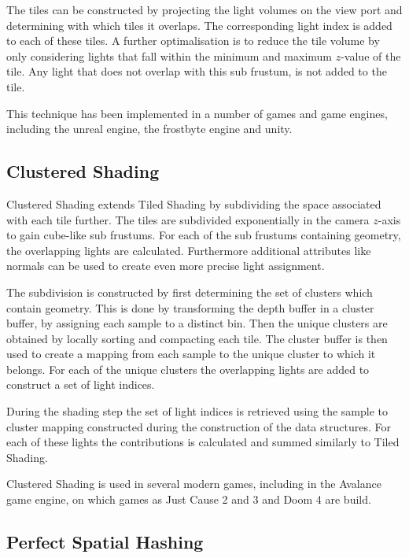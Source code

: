The tiles can be constructed by projecting the light volumes on the view port
and determining with which tiles it overlaps. The corresponding light index
is added to each of these tiles. A further optimalisation is to reduce the
tile volume by only considering lights that fall within the minimum and
maximum $z$-value of the tile. Any light that does not overlap with this
sub frustum, is not added to the tile.

This technique has been implemented in a number of games\cite{} and game engines\cite{}, including
the unreal engine\cite{}, the frostbyte engine\cite{} and unity\cite{}.

\subsection{Clustered Shading}

Clustered Shading\cite{} extends Tiled Shading by subdividing the space associated
with each tile further. The tiles are subdivided exponentially in the camera
$z$-axis to gain cube-like sub frustums. For each of the sub frustums containing
geometry, the overlapping lights are calculated. Furthermore additional
attributes like normals can be used to create even more precise light assignment.

The subdivision is constructed by first determining the set of clusters which
contain geometry. This is done by transforming the depth buffer in a cluster
buffer, by assigning each sample to a distinct bin. Then the unique clusters
are obtained by locally sorting and compacting each tile. The cluster buffer
is then used to create a mapping from each sample to the unique cluster to
which it belongs. For each of the unique clusters the overlapping lights
are added to construct a set of light indices.

During the shading step the set of light indices is retrieved using the
sample to cluster mapping constructed during the construction of the data
structures. For each of these lights the contributions is calculated and
summed similarly to Tiled Shading.

Clustered Shading is used in several modern games, including in the Avalance
game engine, on which games as Just Cause 2 and 3\cite{} and Doom 4\cite{} are build.

\subsection{Perfect Spatial Hashing}

